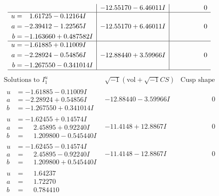\documentclass[1p]{elsarticle_modified}
\theoremstyle{definition}
\newcommand{\I}{\sqrt{-1}}
\begin{document}
$$\begin{array}{c|c|c}
 & -12.55170 - 6.46011 I & \phantom{-0.000000 } 0 \\ \hline\begin{aligned}
u &= \phantom{-}1.61725 - 0.12164 I \\
a &= -2.39412 - 1.22565 I \\
b &= -1.163660 + 0.487582 I\end{aligned}
 & -12.55170 + 6.46011 I & \phantom{-0.000000 } 0 \\ \hline\begin{aligned}
u &= -1.61885 + 0.11009 I \\
a &= -2.28924 - 0.54856 I \\
b &= -1.267550 - 0.341014 I\end{aligned}
 & -12.88440 + 3.59966 I & \phantom{-0.000000 } 0\\
 \hline 
 \end{array}$$\newpage$$\begin{array}{c|c|c}  
\text{Solutions to }I^u_{1}& \I (\text{vol} + \sqrt{-1}CS) & \text{Cusp shape}\\
 \hline 
\begin{aligned}
u &= -1.61885 - 0.11009 I \\
a &= -2.28924 + 0.54856 I \\
b &= -1.267550 + 0.341014 I\end{aligned}
 & -12.88440 - 3.59966 I & \phantom{-0.000000 } 0 \\ \hline\begin{aligned}
u &= -1.62455 + 0.14574 I \\
a &= \phantom{-}2.45895 + 0.92240 I \\
b &= \phantom{-}1.209800 - 0.545440 I\end{aligned}
 & -11.4148 + 12.8867 I & \phantom{-0.000000 } 0 \\ \hline\begin{aligned}
u &= -1.62455 - 0.14574 I \\
a &= \phantom{-}2.45895 - 0.92240 I \\
b &= \phantom{-}1.209800 + 0.545440 I\end{aligned}
 & -11.4148 - 12.8867 I & \phantom{-0.000000 } 0 \\ \hline\begin{aligned}
u &= \phantom{-}1.64237\phantom{ +0.000000I} \\
a &= \phantom{-}1.72270\phantom{ +0.000000I} \\
b &= \phantom{-}0.784410\phantom{ +0.000000I}\end{aligned}

\end{array}$$
\end{document}

